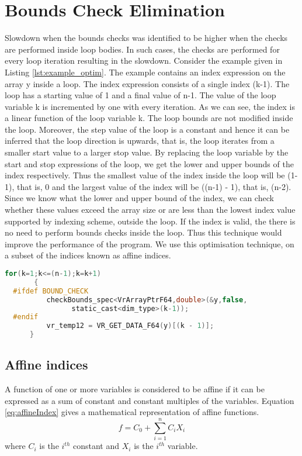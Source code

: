 \section{Bounds Check Elimination}
Slowdown when the bounds checks was identified to be higher when the checks are performed inside loop bodies. In such cases, the checks are performed for every loop iteration resulting in the slowdown. Consider the example given in Listing \ref{lst:example_optim}. The example contains an index expression on the array y inside a loop. The index expression consists of a single index (k-1). The loop has a starting value of 1 and a final value of n-1. The value of the loop variable k is incremented by one with every iteration. As we can see, the index is a linear function of the loop variable k. The loop bounds are not modified inside the loop. Moreover, the step value of the loop is a constant and hence it can be inferred that the loop direction is upwards, that is, the loop iterates from a smaller start value to a larger stop value. By replacing the loop variable by the start and stop expressions of the loop, we get the lower and upper bounds of the index respectively. Thus the smallest value of the index inside the loop will be (1-1), that is, 0 and the largest value of the index will be ((n-1) - 1), that is, (n-2). Since we know what the lower and upper bound of the index, we can check whether these values exceed the array size or are less than the lowest index value supported by indexing scheme, outside the loop. If the index is valid, the there is no need to perform bounds checks inside the loop. Thus this technique would improve the performance of the program. We use this optimisation technique, on a subset of the indices known as affine indices. 
\begin{lstlisting}[float,language=c,caption={Example C++ for loop with array index expressions},label={lst:example_optim}]
   for(k=1;k<=(n-1);k=k+1)
       {
  #ifdef BOUND_CHECK
          checkBounds_spec<VrArrayPtrF64,double>(&y,false,
				static_cast<dim_type>(k-1));
  #endif
          vr_temp12 = VR_GET_DATA_F64(y)[(k - 1)];
      }
\end{lstlisting}
\subsection{Affine indices}
A function of one or more variables is considered to be affine if it can be expressed as a sum of constant and constant multiples of the variables. Equation \ref{eq:affineIndex} gives a mathematical representation of affine functions. 
\begin{equation}
\label{eq:affineIndex}
f = C_0 + \sum\limits_{i=1}^n C_iX_i 
\end{equation}
where $C_i$ is the $i^{th}$ constant and $X_i$ is the $i^{th}$ variable. 

